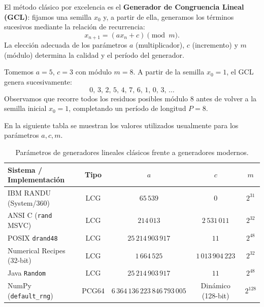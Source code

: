 \documentclass[12pt]{article}
\begin{document}
El método clásico por excelencia es el \textbf{Generador de Congruencia Lineal (GCL)}: fijamos una semilla $x_0$ 
y, a partir de ella, generamos los términos sucesivos mediante la relación de recurrencia:
\begin{equation*}
    x_{n+1} = (a x_n + c) \pmod m.
\end{equation*}
La elección adecuada de los parámetros $a$ (multiplicador), $c$ (incremento) y $m$ (módulo) determina la calidad y el período del generador.

\begin{cajaflex}
Tomemos $a=5$, $c=3$ con módulo $m=8$. A partir de la semilla $x_0=1$, el GCL genera sucesivamente:
\begin{equation*}
    0,\, 3,\, 2,\, 5,\, 4,\, 7,\, 6,\, 1,\, 0,\, 3,\, \dots
\end{equation*}
Observamos que recorre todos los residuos posibles módulo 8 antes de volver a la semilla inicial $x_0=1$, completando un período de longitud $P = 8$.
\end{cajaflex}

En la siguiente tabla se muestran los valores utilizados usualmente 
para los parámetros $a, c, m$.
%
\begin{table}[htbp]
\centering
\small
\caption{Parámetros de generadores lineales clásicos frente a generadores modernos.}
\label{tab:prng_parametros}
\begin{tabular}{lcccc}
\hline
\textbf{Sistema / Implementación} & \textbf{Tipo} & $a$ & $c$ & $m$ \\
\hline
IBM RANDU (System/360)   & LCG & $65\,539$ & $0$ & $2^{31}$ \\
ANSI C (\texttt{rand} MSVC) & LCG & $214\,013$ & $2\,531\,011$ & $2^{32}$ \\
POSIX \texttt{drand48}   & LCG & $25\,214\,903\,917$ & $11$ & $2^{48}$ \\
Numerical Recipes (32-bit)& LCG & $1\,664\,525$ & $1\,013\,904\,223$ & $2^{32}$ \\
Java \texttt{Random}     & LCG & $25\,214\,903\,917$ & $11$ & $2^{48}$ \\
\hline
NumPy (\texttt{default\_rng}) & PCG64 & $6\,364\,136\,223\,846\,793\,005$ & Dinámico (128-bit) & $2^{128}$ \\
\hline
\end{tabular}
\end{table}
%
\end{document}

